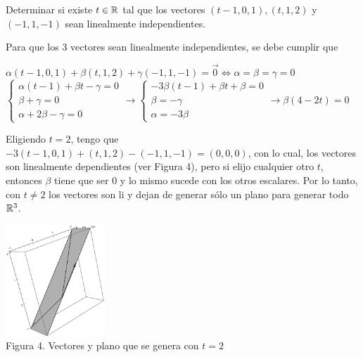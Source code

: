 \item Determinar si existe $t\in\mathbb{R}$ tal que los vectores $(t - 1, 0, 1), (t, 1, 2)$ y $(-1, 1, -1)$ sean linealmente independientes.
    \begin{mdframed}[style=s]
        Para que los 3 vectores sean linealmente independientes, se debe cumplir que 
        \begin{center}
            $\alpha(t-1,0,1)+\beta(t,1,2)+\gamma(-1,1,-1)=\vec{0}\Leftrightarrow \alpha=\beta=\gamma=0$\\
            $\begin{cases}
                \alpha(t-1)+\beta t-\gamma=0\\
                \beta+\gamma=0\\
                \alpha+2\beta-\gamma=0
            \end{cases}\to\begin{cases}
                -3\beta(t-1)+\beta t+\beta=0\\
                \beta=-\gamma\\
                \alpha=-3\beta
            \end{cases}\to\beta(4-2t)=0$
        \end{center}
        Eligiendo $t=2$, tengo que $-3(t-1,0,1)+(t,1,2)-(-1,1,-1)=(0,0,0)$, con lo cual, los vectores son linealmente dependientes (ver Figura 4), pero si elijo cualquier otro $t$, entonces $\beta$ tiene que ser 0 y lo mismo sucede con los otros escalares. Por lo tanto, con $t\neq 2$ los vectores son li y dejan de generar sólo un plano para generar todo $\mathbb{R}^3$.
        \begin{center}
            \includegraphics[width=0.28\textwidth]{Ej3.png}\\
            Figura 4. Vectores y plano que se genera con $t=2$
        \end{center}
    \end{mdframed}